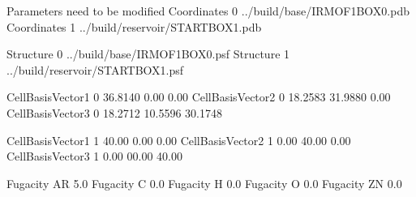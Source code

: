 \documentclass[letterpaper,10pt,english]{sphinxmanual}
\begin{document}
\begin{sphinxVerbatim}[commandchars=\\\{\}]
\PYGZsh{}\PYGZsh{}\PYGZsh{}\PYGZsh{}\PYGZsh{}\PYGZsh{}\PYGZsh{}\PYGZsh{}\PYGZsh{}\PYGZsh{}\PYGZsh{}\PYGZsh{}\PYGZsh{}\PYGZsh{}\PYGZsh{}\PYGZsh{}\PYGZsh{}\PYGZsh{}\PYGZsh{}\PYGZsh{}\PYGZsh{}\PYGZsh{}\PYGZsh{}\PYGZsh{}\PYGZsh{}\PYGZsh{}\PYGZsh{}\PYGZsh{}\PYGZsh{}\PYGZsh{}\PYGZsh{}\PYGZsh{}\PYGZsh{}\PYGZsh{}\PYGZsh{}\PYGZsh{}\PYGZsh{}\PYGZsh{}\PYGZsh{}\PYGZsh{}\PYGZsh{}\PYGZsh{}\PYGZsh{}\PYGZsh{}\PYGZsh{}\PYGZsh{}\PYGZsh{}\PYGZsh{}\PYGZsh{}\PYGZsh{}\PYGZsh{}\PYGZsh{}\PYGZsh{}\PYGZsh{}\PYGZsh{}\PYGZsh{}
\PYGZsh{} Parameters need to be modified
\PYGZsh{}\PYGZsh{}\PYGZsh{}\PYGZsh{}\PYGZsh{}\PYGZsh{}\PYGZsh{}\PYGZsh{}\PYGZsh{}\PYGZsh{}\PYGZsh{}\PYGZsh{}\PYGZsh{}\PYGZsh{}\PYGZsh{}\PYGZsh{}\PYGZsh{}\PYGZsh{}\PYGZsh{}\PYGZsh{}\PYGZsh{}\PYGZsh{}\PYGZsh{}\PYGZsh{}\PYGZsh{}\PYGZsh{}\PYGZsh{}\PYGZsh{}\PYGZsh{}\PYGZsh{}\PYGZsh{}\PYGZsh{}\PYGZsh{}\PYGZsh{}\PYGZsh{}\PYGZsh{}\PYGZsh{}\PYGZsh{}\PYGZsh{}\PYGZsh{}\PYGZsh{}\PYGZsh{}\PYGZsh{}\PYGZsh{}\PYGZsh{}\PYGZsh{}\PYGZsh{}\PYGZsh{}\PYGZsh{}\PYGZsh{}\PYGZsh{}\PYGZsh{}\PYGZsh{}\PYGZsh{}\PYGZsh{}\PYGZsh{}
Coordinates     0   ../build/base/IRMOF\PYGZus{}1\PYGZus{}BOX\PYGZus{}0.pdb
Coordinates     1   ../build/reservoir/START\PYGZus{}BOX\PYGZus{}1.pdb

Structure       0   ../build/base/IRMOF\PYGZus{}1\PYGZus{}BOX\PYGZus{}0.psf
Structure       1   ../build/reservoir/START\PYGZus{}BOX\PYGZus{}1.psf

CellBasisVector1    0   36.8140   0.00     0.00
CellBasisVector2    0   18.2583  31.9880   0.00
CellBasisVector3    0   18.2712  10.5596  30.1748

CellBasisVector1    1   40.00     0.00    0.00
CellBasisVector2    1    0.00    40.00    0.00
CellBasisVector3    1    0.00    00.00   40.00

Fugacity    AR      5.0
Fugacity    C       0.0
Fugacity    H       0.0
Fugacity    O       0.0
Fugacity    ZN      0.0
\end{sphinxVerbatim}
\end{document}

